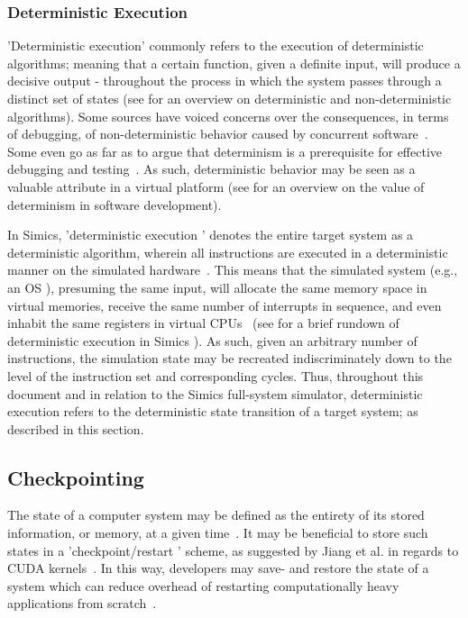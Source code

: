\subsubsection{Deterministic Execution}
\label{sec:simics_deterministicexecution}
'Deterministic execution' commonly refers to the execution of deterministic algorithms; meaning that a certain function, given a definite input, will produce a decisive output - throughout the process in which the system passes through a distinct set of states (see  for an overview on deterministic and non-deterministic algorithms).
Some sources have voiced concerns over the consequences, in terms of debugging, of non-deterministic behavior caused by concurrent software~.
Some even go as far as to argue that determinism is a prerequisite for effective debugging and testing~.
As such, deterministic behavior may be seen as a valuable attribute in a virtual platform (see  for an overview on the value of determinism in software development).

In Simics, 'deterministic execution ' denotes the entire target system as a deterministic algorithm, wherein all instructions are executed in a deterministic manner on the simulated hardware~.
This means that the simulated system (e.g., an OS ), presuming the same input, will allocate the same memory space in virtual memories, receive the same number of interrupts in sequence, and even inhabit the same registers in virtual CPUs~ (see  for a brief rundown of deterministic execution in Simics ).
As such, given an arbitrary number of instructions, the simulation state may be recreated indiscriminately down to the level of the instruction set and corresponding cycles.
Thus, throughout this document and in relation to the Simics full-system simulator, deterministic execution refers to the deterministic state transition of a target system; as described in this section.

\subsection{Checkpointing}
\label{sec:simics_checkpointing}
The state of a computer system may be defined as the entirety of its stored information, or memory, at a given time~.
It may be beneficial to store such states in a 'checkpoint/restart ' scheme, as suggested by Jiang et al. in regards to CUDA kernels~.
In this way, developers may save- and restore the state of a system which can reduce overhead of restarting computationally heavy applications from scratch~.

